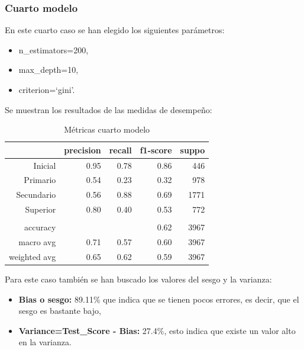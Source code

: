 \documentclass[a4paper]{article}
\begin{document}
        \subsubsection{Cuarto modelo}

            En este cuarto caso se han elegido los siguientes parámetros:
            \begin{itemize}
                \item n\_estimators=200,
                \item max\_depth=10,
                \item criterion=`gini'.
            \end{itemize}

            Se muestran los resultados de las medidas de desempeño:
            \begin{table}[H]
                \centering
                \begin{tabular}{rrrrr}
                    \toprule
                    ~ & precision & recall & f1-score & suppo \\ \midrule
                    Inicial    & 0.95 & 0.78 & 0.86 & 446 \\
                    Primario   & 0.54 & 0.23 & 0.32 & 978 \\
                    Secundario & 0.56 & 0.88 & 0.69 & 1771 \\
                    Superior   & 0.80 & 0.40 & 0.53 & 772 \\
                    & & & & \\
                    accuracy & & & 0.62 & 3967 \\
                    macro avg & 0.71 & 0.57 & 0.60 & 3967 \\
                    weighted avg & 0.65 & 0.62 & 0.59 & 3967 \\
                    \bottomrule
                \end{tabular}
                \caption{Métricas cuarto modelo}
                \label{Fourth model metrics}
            \end{table}

            Para este caso también se han buscado los valores del sesgo y la varianza:
            \begin{itemize}
                \item \textbf{Bias o sesgo:} 89.11\% que indica que se tienen pocos errores, es decir, que el sesgo es bastante bajo,
                \item \textbf{Variance=Test\_Score - Bias:} 27.4\%, esto indica que existe un valor alto en la varianza.
             \end{itemize}
\end{document}
